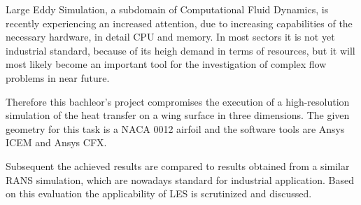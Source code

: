 Large Eddy Simulation, a subdomain of Computational Fluid Dynamics, is recently experiencing an increased attention, due to increasing capabilities of the necessary hardware, in detail CPU and memory. In most sectors it is not yet industrial standard, because of its heigh demand in terms of resources, but it will most likely become an important tool for the investigation of complex flow problems in near future. 

Therefore this bachleor's project compromises the execution of a high-resolution simulation of the heat transfer on a wing surface in three dimensions. The given geometry for this task is a NACA 0012 airfoil and the software tools are Ansys ICEM and Ansys CFX. 

Subsequent the achieved results are compared to results obtained from a similar RANS simulation, which are nowadays standard for industrial application. Based on this evaluation the applicability of LES is scrutinized and discussed.